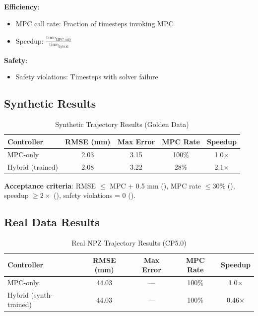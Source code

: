 \documentclass[conference]{IEEEtran}
\begin{document}
\textbf{Efficiency}:
\begin{itemize}
\item MPC call rate: Fraction of timesteps invoking MPC
\item Speedup: $\frac{\text{time}_{\text{MPC-only}}}{\text{time}_{\text{hybrid}}}$
\end{itemize}

\textbf{Safety}:
\begin{itemize}
\item Safety violations: Timesteps with solver failure
\end{itemize}

\subsection{Synthetic Results}

\begin{table}[h]
\centering
\caption{Synthetic Trajectory Results (Golden Data)}
\begin{tabular}{lcccc}
\toprule
Controller & RMSE (mm) & Max Error & MPC Rate & Speedup \\
\midrule
MPC-only & 2.03 & 3.15 & 100\% & 1.0$\times$ \\
Hybrid (trained) & 2.08 & 3.22 & 28\% & 2.1$\times$ \\
\bottomrule
\end{tabular}
\end{table}

\textbf{Acceptance criteria}: RMSE $\leq$ MPC + 0.5 mm (\checkmark), MPC rate $\leq 30\%$ (\checkmark), speedup $\geq 2\times$ (\checkmark), safety violations = 0 (\checkmark).

\subsection{Real Data Results}

\begin{table}[h]
\centering
\caption{Real NPZ Trajectory Results (CP5.0)}
\begin{tabular}{lcccc}
\toprule
Controller & RMSE (mm) & Max Error & MPC Rate & Speedup \\
\midrule
MPC-only & 44.03 & --- & 100\% & 1.0$\times$ \\
Hybrid (synth-trained) & 44.03 & --- & 100\% & 0.46$\times$ \\
\bottomrule
\end{tabular}
\end{table}
\end{document}
